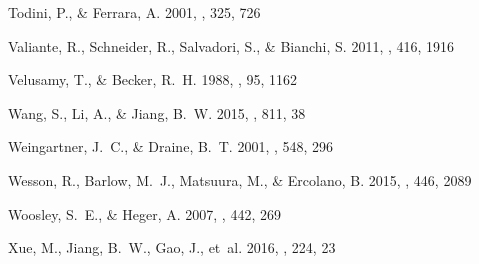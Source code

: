\documentclass{emulateapj}
\begin{document}
\begin{thebibliography}{52}
{Todini}, P., \& {Ferrara}, A. 2001, \mnras, 325, 726

{Valiante}, R., {Schneider}, R., {Salvadori}, S., \& {Bianchi}, S. 2011,
  \mnras, 416, 1916

{Velusamy}, T., \& {Becker}, R.~H. 1988, \aj, 95, 1162

{Wang}, S., {Li}, A., \& {Jiang}, B.~W. 2015, \apj, 811, 38

{Weingartner}, J.~C., \& {Draine}, B.~T. 2001, \apj, 548, 296

{Wesson}, R., {Barlow}, M.~J., {Matsuura}, M., \& {Ercolano}, B. 2015, \mnras,
  446, 2089

{Woosley}, S.~E., \& {Heger}, A. 2007, \physrep, 442, 269

{Xue}, M., {Jiang}, B.~W., {Gao}, J., {et~al.} 2016, \apjs, 224, 23

\end{thebibliography}
\end{document}
